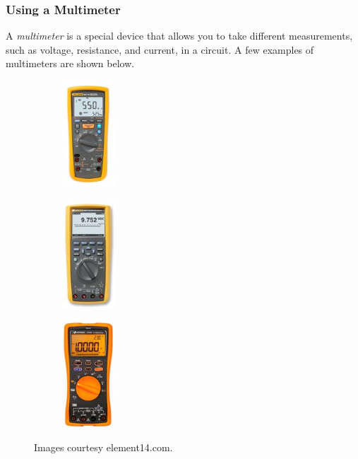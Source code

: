     \subsubsection*{Using a Multimeter}
    A \emph{multimeter} is a special device that allows you to take different measurements, such as voltage, resistance, and current, in a circuit. A few examples of multimeters are shown below.

    \begin{figure}[h]
        \centering
        \begin{subfigure}{0.25\boxwidth}
            \centering
            \includegraphics[height=4cm]{Extras/multimeter1}
        \end{subfigure}
        \begin{subfigure}{0.25\boxwidth}
            \centering
            \includegraphics[height=4cm]{Extras/multimeter2}
        \end{subfigure}
        \begin{subfigure}{0.25\boxwidth}
            \centering
            \includegraphics[height=4cm]{Extras/multimeter3}
        \end{subfigure}
        \caption*{\scriptsize Images courtesy element14.com.}
    \end{figure}


